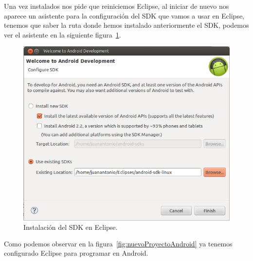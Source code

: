 Una vez instalados nos pide que reiniciemos Eclipse, al iniciar de nuevo nos aparece un asistente para la configuración del SDK que vamos a usar en Eclipse, tenemos que saber la ruta donde hemos instalado anteriormente el SDK, podemos ver el asistente en la siguiente figura~\ref{fig:configuracionSDK}.
 
\begin{figure}
  \centering
    \includegraphics[scale=0.6]{./ConfiguracionEclipse/imagenes/configuracionSDK.png}
  \caption{Instalación del SDK en Eclipse.}
  \label{fig:configuracionSDK}
\end{figure}

Como podemos observar en la figura~\ref{fig:nuevoProyectoAndroid} ya tenemos configurado Eclipse para programar en Android.

